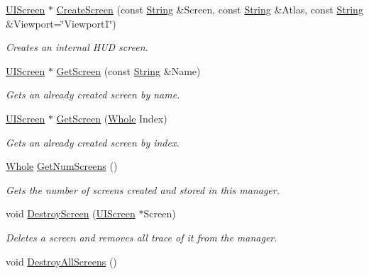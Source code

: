 \begin{DoxyCompactItemize}
\hyperlink{classphys_1_1UIScreen}{UIScreen} $\ast$ \hyperlink{classphys_1_1UIManager_a4cf5fa1aa826d478847463660d27ec59}{CreateScreen} (const \hyperlink{namespacephys_aa03900411993de7fbfec4789bc1d392e}{String} \&Screen, const \hyperlink{namespacephys_aa03900411993de7fbfec4789bc1d392e}{String} \&Atlas, const \hyperlink{namespacephys_aa03900411993de7fbfec4789bc1d392e}{String} \&Viewport=\char`\"{}Viewport1\char`\"{})
\begin{DoxyCompactList}\small\item\em Creates an internal HUD screen. \item\end{DoxyCompactList}\item 
\hyperlink{classphys_1_1UIScreen}{UIScreen} $\ast$ \hyperlink{classphys_1_1UIManager_a8cd693c7ec9c458fcc4169eea0d7b4db}{GetScreen} (const \hyperlink{namespacephys_aa03900411993de7fbfec4789bc1d392e}{String} \&Name)
\begin{DoxyCompactList}\small\item\em Gets an already created screen by name. \item\end{DoxyCompactList}\item 
\hyperlink{classphys_1_1UIScreen}{UIScreen} $\ast$ \hyperlink{classphys_1_1UIManager_a6083b86b2e240cc316e8ca87479d15a8}{GetScreen} (\hyperlink{namespacephys_a460f6bc24c8dd347b05e0366ae34f34a}{Whole} Index)
\begin{DoxyCompactList}\small\item\em Gets an already created screen by index. \item\end{DoxyCompactList}\item 
\hyperlink{namespacephys_a460f6bc24c8dd347b05e0366ae34f34a}{Whole} \hyperlink{classphys_1_1UIManager_a3bd28c361f6fc79a182ebd3ec0a26ec7}{GetNumScreens} ()
\begin{DoxyCompactList}\small\item\em Gets the number of screens created and stored in this manager. \item\end{DoxyCompactList}\item 
void \hyperlink{classphys_1_1UIManager_a5afab78f58a6531fc18771f5a4eeccf8}{DestroyScreen} (\hyperlink{classphys_1_1UIScreen}{UIScreen} $\ast$Screen)
\begin{DoxyCompactList}\small\item\em Deletes a screen and removes all trace of it from the manager. \item\end{DoxyCompactList}\item 
\hypertarget{classphys_1_1UIManager_a97555e02aad6c85cac6bf67fbe074cd1}{
void \hyperlink{classphys_1_1UIManager_a97555e02aad6c85cac6bf67fbe074cd1}{DestroyAllScreens} ()}
\label{d5/dc5/classphys_1_1UIManager_a97555e02aad6c85cac6bf67fbe074cd1}


\end{DoxyCompactItemize}
